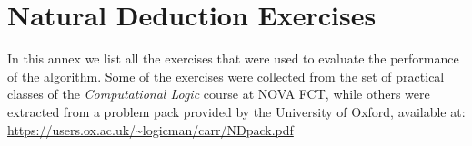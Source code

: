 
%


\chapter{Natural Deduction Exercises}
In this annex we list all the exercises that were used to evaluate the performance of the algorithm. 
Some of the exercises were collected from the set of practical classes of the \textit{Computational Logic} course at NOVA FCT, 
while others were extracted from a problem pack provided by the University of Oxford, available at:
\url{https://users.ox.ac.uk/~logicman/carr/NDpack.pdf}

